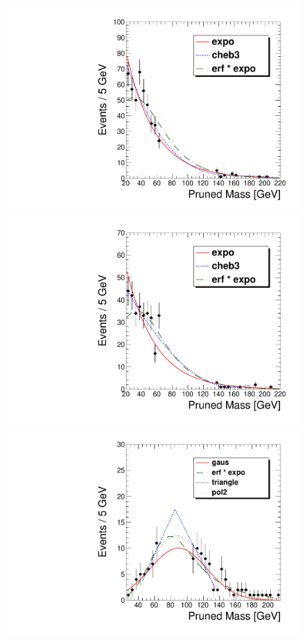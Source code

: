 \begin{figure}[hb!]
\begin{center}
\includegraphics[scale=0.35]{figures/fits/thiagoFitMLP.pdf}
\includegraphics[scale=0.35]{figures/fits/thiagoFitELP.pdf}\\
\includegraphics[scale=0.35]{figures/fits/thiagoFitMHP.pdf}

\end{center}
\end{figure}
